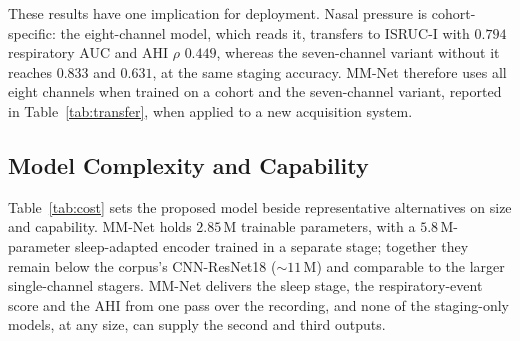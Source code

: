 \documentclass[a4paper,fleqn]{cas-sc}
\begin{document}
These results have one implication for deployment. Nasal pressure is cohort-specific: the eight-channel
model, which reads it, transfers to ISRUC-I with $0.794$ respiratory AUC and AHI $\rho$ $0.449$,
whereas the seven-channel variant without it reaches $0.833$ and $0.631$, at the same staging
accuracy. MM-Net therefore uses all eight channels when trained on a cohort and the
seven-channel variant, reported in Table~\ref{tab:transfer}, when applied to a new acquisition
system.

\begin{table}[H]
\caption{MM-Net trained on all $99$ iSLEEPS patients and applied without retraining
(three-seed, seven-channel variant without nasal pressure; AHI scale $k$ from iSLEEPS). AHI is
not reported for the healthy ISRUC-III subjects.}
\label{tab:transfer}
\centering
\small
\setlength{\tabcolsep}{3pt}
\end{table}

\subsection{Model Complexity and Capability}
Table~\ref{tab:cost} sets the proposed model beside representative alternatives on size and
capability. MM-Net holds $2.85$\,M trainable parameters, with a $5.8$\,M-parameter
sleep-adapted encoder trained in a separate stage; together they remain below the corpus's
CNN-ResNet18 ($\sim$$11$\,M) and comparable to the larger single-channel stagers. MM-Net
delivers the sleep stage, the respiratory-event score and the AHI from one pass over the
recording, and none of the staging-only models, at any size, can supply the second and third
outputs.
\end{document}
